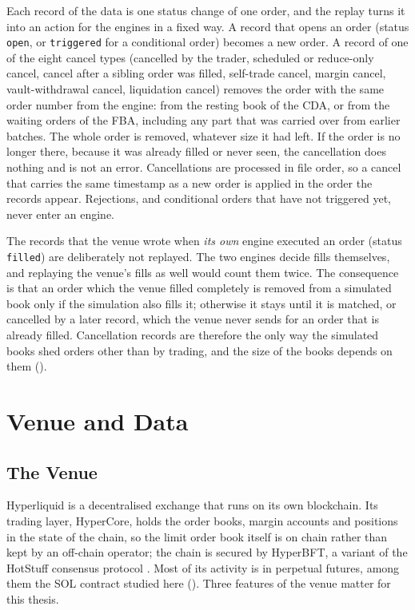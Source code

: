 Each record of the data is one status change of one order, and the replay turns
it into an action for the engines in a fixed way. A record that opens an order
(status \texttt{open}, or \texttt{triggered} for a conditional order) becomes a
new order. A record of one of the eight cancel types (cancelled by the trader,
scheduled or reduce-only cancel, cancel after a sibling order was filled,
self-trade cancel, margin cancel, vault-withdrawal cancel, liquidation cancel)
removes the order with the same order number from the engine: from the resting
book of the CDA, or from the waiting orders of the FBA, including any part that
was carried over from earlier batches. The whole order is removed, whatever size
it had left. If the order is no longer there, because it was already filled or
never seen, the cancellation does nothing and is not an error. Cancellations
are processed in file order, so a cancel that carries the same timestamp as a
new order is applied in the order the records appear. Rejections, and conditional
orders that have not triggered yet, never enter an engine.

The records that the venue wrote when \emph{its own} engine executed an order
(status \texttt{filled}) are deliberately not replayed. The two engines decide
fills themselves, and replaying the venue's fills as well would count them
twice. The consequence is that an order which the venue filled completely is
removed from a simulated book only if the simulation also fills it; otherwise it
stays until it is matched, or cancelled by a later record, which the venue never
sends for an order that is already filled. Cancellation records are therefore
the only way the simulated books shed orders other than by trading, and the size
of the books depends on them ().

\section{Venue and Data}
\label{sec:data}

\subsection{The Venue}
\label{sec:venue}

Hyperliquid is a decentralised exchange that runs on its own blockchain. Its
trading layer, HyperCore, holds the order books, margin accounts and
positions in the state of the chain, so the limit order book itself is on
chain rather than kept by an off-chain operator; the chain is secured by
HyperBFT, a variant of the HotStuff consensus protocol
\citep{hyperliquid2026docs}. Most of its activity is in perpetual futures,
among them the SOL contract studied here (). Three
features of the venue matter for this thesis.

